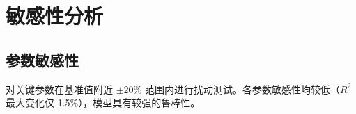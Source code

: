 \section{敏感性分析}

\subsection{参数敏感性}

对关键参数在基准值附近 $\pm 20\%$ 范围内进行扰动测试。各参数敏感性均较低（$R^2$ 最大变化仅 1.5\%），模型具有较强的鲁棒性。
